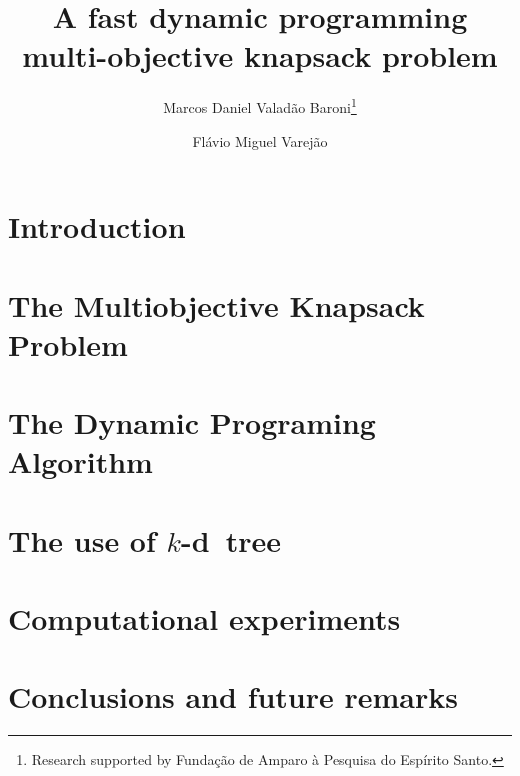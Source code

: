 \documentclass{article}
\newcommand{\kdtree}{$k$-d~tree}
\begin{document}
\title{A fast dynamic programming multi-objective knapsack problem}

\author{
   Marcos Daniel Valad\~ao Baroni\thanks{Research supported by Funda\c c\~ao de Amparo \`a Pesquisa do Esp\'irito Santo.}
   \and
   Fl\'avio Miguel Varej\~ao
}





\maketitle

\begin{abstract}

\end{abstract}

\section{Introduction}
\label{sec:intro}


\section{The Multiobjective Knapsack Problem}
\label{sec:mokp}


\section{The Dynamic Programing Algorithm}
\label{sec:progdyn}


\section{The use of \kdtree{}}
\label{sec:kdtree}


\section{Computational experiments}
\label{sec:exp}


\section{Conclusions and future remarks}
\label{sec:conc}




\end{document}
